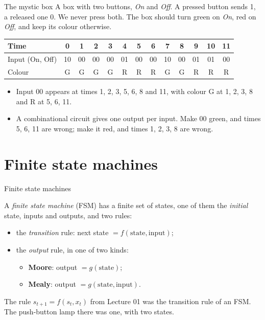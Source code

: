 \documentclass[10pt]{wosm-slides}
\begin{document}
\begin{frame}{The mystic box}
  A box with two buttons, \emph{On} and \emph{Off}. A pressed button sends 1, a
  released one 0. We never press both. The box should turn green on \emph{On}, red
  on \emph{Off}, and keep its colour otherwise.

  \medskip
  \begin{center}
    \small
    \begin{tabular}{@{}l|*{12}{c}@{}}
      Time & 0 & 1 & 2 & 3 & 4 & 5 & 6 & 7 & 8 & 9 & 10 & 11 \\
      \midrule
      Input (On, Off) & 10 & 00 & 00 & 00 & 01 & 00 & 00 & 10 & 00 & 01 & 01 & 00 \\
      Colour & G & G & G & G & R & R & R & G & G & R & R & R \\
    \end{tabular}
  \end{center}

  \medskip
  \begin{itemize}
    \item Input 00 appears at times 1, 2, 3, 5, 6, 8 and 11, with colour G at 1, 2,
      3, 8 and R at 5, 6, 11.
    \item A combinational circuit gives one output per input. Make 00 green, and
      times 5, 6, 11 are wrong; make it red, and times 1, 2, 3, 8 are wrong.
  \end{itemize}
\end{frame}

\section{Finite state machines}

\begin{frame}{Finite state machines}
  \begin{definition}
    A \emph{finite state machine} (FSM) has a finite set of states, one of them the
    \emph{initial} state, inputs and outputs, and two rules:
    \begin{itemize}
      \item the \emph{transition} rule: next state $= f(\text{state}, \text{input})$;
      \item the \emph{output} rule, in one of two kinds:
        \begin{itemize}
          \item \textbf{Moore}: output $= g(\text{state})$;
          \item \textbf{Mealy}: output $= g(\text{state}, \text{input})$.
        \end{itemize}
    \end{itemize}
  \end{definition}

  \medskip
  The rule $s_{t+1} = f(s_t, x_t)$ from Lecture 01 was the transition rule of an FSM.
  The push-button lamp there was one, with two states.
\end{frame}
\end{document}
